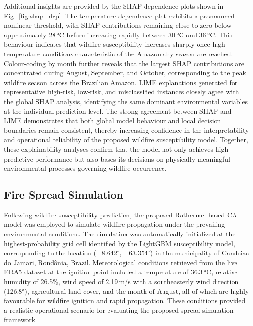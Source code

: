 \documentclass{ieeeaccess}
\begin{document}
Additional insights are provided by the SHAP dependence plots shown in Fig.~\ref{fig:shap_dep}. The temperature dependence plot exhibits a pronounced nonlinear threshold, with SHAP contributions remaining close to zero below approximately 28\,°C before increasing rapidly between 30\,°C and 36\,°C. This behaviour indicates that wildfire susceptibility increases sharply once high-temperature conditions characteristic of the Amazon dry season are reached. Colour-coding by month further reveals that the largest SHAP contributions are concentrated during August, September, and October, corresponding to the peak wildfire season across the Brazilian Amazon. LIME explanations generated for representative high-risk, low-risk, and misclassified instances closely agree with the global SHAP analysis, identifying the same dominant environmental variables at the individual prediction level. The strong agreement between SHAP and LIME demonstrates that both global model behaviour and local decision boundaries remain consistent, thereby increasing confidence in the interpretability and operational reliability of the proposed wildfire susceptibility model. Together, these explainability analyses confirm that the model not only achieves high predictive performance but also bases its decisions on physically meaningful environmental processes governing wildfire occurrence.

\subsection{Fire Spread Simulation}
\label{sec:spread-results}

Following wildfire susceptibility prediction, the proposed Rothermel-based CA model was employed to simulate wildfire propagation under the prevailing environmental conditions. The simulation was automatically initialized at the highest-probability grid cell identified by the LightGBM susceptibility model, corresponding to the location ($-8.642^{\circ}$, $-63.354^{\circ}$) in the municipality of Candeias do Jamari, Rondônia, Brazil. Meteorological conditions retrieved from the live ERA5 dataset at the ignition point included a temperature of 36.3\,°C, relative humidity of 26.5\%, wind speed of 2.19\,m/s with a southeasterly wind direction (126.8°), agricultural land cover, and the month of August, all of which are highly favourable for wildfire ignition and rapid propagation. These conditions provided a realistic operational scenario for evaluating the proposed spread simulation framework.
\end{document}
